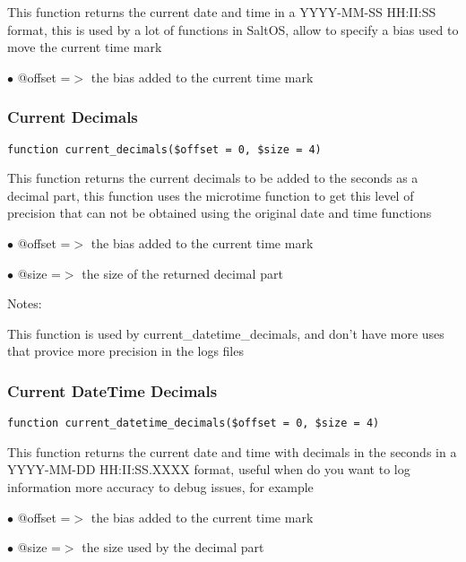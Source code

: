 \documentclass[a4paper]{article}
\begin{document}
This function returns the current date and time in a YYYY-MM-SS HH:II:SS format,
this is used by a lot of functions in SaltOS, allow to specify a bias used to
move the current time mark

\begin{compactitem}
\item[\color{myblue}$\bullet$] @offset =$>$ the bias added to the current time mark
\end{compactitem}

\hypertarget{toc101}{}
\subsubsection{Current Decimals}

\begin{lstlisting}
function current_decimals($offset = 0, $size = 4)
\end{lstlisting}

This function returns the current decimals to be added to the seconds as a
decimal part, this function uses the microtime function to get this level of
precision that can not be obtained using the original date and time functions

\begin{compactitem}
\item[\color{myblue}$\bullet$] @offset =$>$ the bias added to the current time mark
\item[\color{myblue}$\bullet$] @size   =$>$ the size of the returned decimal part
\end{compactitem}

Notes:

This function is used by current\_datetime\_decimals, and don't have more uses
that provice more precision in the logs files

\hypertarget{toc102}{}
\subsubsection{Current DateTime Decimals}

\begin{lstlisting}
function current_datetime_decimals($offset = 0, $size = 4)
\end{lstlisting}

This function returns the current date and time with decimals in the seconds
in a YYYY-MM-DD HH:II:SS.XXXX format, useful when do you want to log information
more accuracy to debug issues, for example

\begin{compactitem}
\item[\color{myblue}$\bullet$] @offset =$>$ the bias added to the current time mark
\item[\color{myblue}$\bullet$] @size   =$>$ the size used by the decimal part
\end{compactitem}
\end{document}
